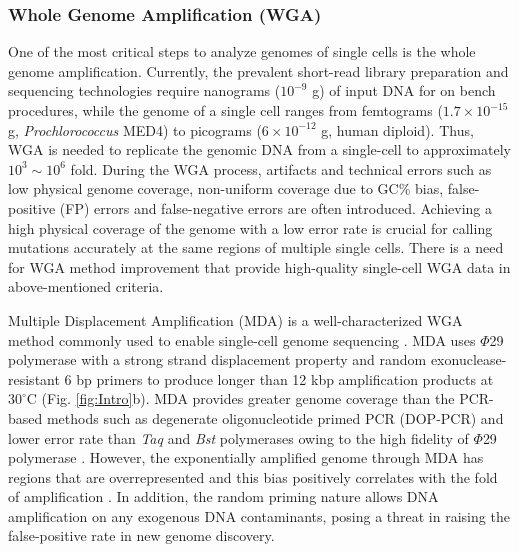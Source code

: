 \subsubsection{Whole Genome Amplification (WGA)}
One of the most critical steps to analyze genomes of single cells is the whole genome amplification. Currently, the prevalent short-read library preparation and sequencing technologies require nanograms ($10^{-9}$ g) of input DNA for on bench procedures, while the genome of a single cell ranges from femtograms ($1.7 \times 10^{-15}$ g, \textit{Prochlorococcus} MED4) to picograms ($6 \times 10^{-12}$ g, human diploid). Thus, WGA is needed to replicate the genomic DNA from a single-cell to approximately $10^3 \sim 10^6$ fold. During the WGA process, artifacts and technical errors such as low physical genome coverage, non-uniform coverage due to GC\% bias, false-positive (FP) errors and false-negative errors are often introduced. Achieving a high physical coverage of the genome with a low error rate is crucial for calling mutations accurately at the same regions of multiple single cells. There is a need for WGA method improvement that provide high-quality single-cell WGA data in above-mentioned criteria.

Multiple Displacement Amplification (MDA) \cite{Dean:2002us} is a well-characterized WGA method commonly used to enable single-cell genome sequencing \cite{Marcy:2007il,Fu:2015gl,Zhang:2006hq,Raghunathan:2005fg,Pamp:2012cj,Dodsworth:2013ih,Hess:2011gu}. MDA uses $\Phi$29 polymerase with a strong strand displacement property and random exonuclease-resistant 6 bp primers to produce longer than 12 kbp amplification products at $30^{\circ}$C (Fig. \ref{fig:Intro}b). MDA provides greater genome coverage than the PCR-based methods such as degenerate oligonucleotide primed PCR (DOP-PCR) and lower error rate than \textit{Taq} and \textit{Bst} polymerases owing to the high fidelity of $\Phi$29 polymerase \cite{Dean:2002us}. However, the exponentially amplified genome through MDA has regions that are overrepresented and this bias positively correlates with the fold of amplification \cite{deBourcy:2014ji}. In addition, the random priming nature allows DNA amplification on any exogenous DNA contaminants, posing a threat in raising the false-positive rate in new genome discovery. 

